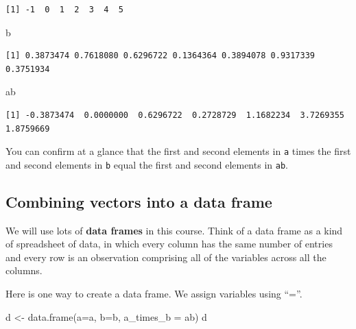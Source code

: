 \documentclass[
  letterpaper,
  DIV=11,
  numbers=noendperiod]{scrreprt}
\newenvironment{Shaded}{\begin{snugshade}}{\end{snugshade}}
\newcommand{\AttributeTok}[1]{\textcolor[rgb]{0.40,0.45,0.13}{#1}}
\newcommand{\FunctionTok}[1]{\textcolor[rgb]{0.28,0.35,0.67}{#1}}
\newcommand{\NormalTok}[1]{\textcolor[rgb]{0.00,0.23,0.31}{#1}}
\newcommand{\OtherTok}[1]{\textcolor[rgb]{0.00,0.23,0.31}{#1}}
\begin{document}
\begin{verbatim}
[1] -1  0  1  2  3  4  5
\end{verbatim}

\begin{Shaded}
\begin{Highlighting}[]
\NormalTok{b}
\end{Highlighting}
\end{Shaded}

\begin{verbatim}
[1] 0.3873474 0.7618080 0.6296722 0.1364364 0.3894078 0.9317339 0.3751934
\end{verbatim}

\begin{Shaded}
\begin{Highlighting}[]
\NormalTok{ab}
\end{Highlighting}
\end{Shaded}

\begin{verbatim}
[1] -0.3873474  0.0000000  0.6296722  0.2728729  1.1682234  3.7269355  1.8759669
\end{verbatim}

You can confirm at a glance that the first and second elements in
\texttt{a} times the first and second elements in \texttt{b} equal the
first and second elements in \texttt{ab}.

\subsection{Combining vectors into a data
frame}\label{combining-vectors-into-a-data-frame}

We will use lots of \textbf{data frames} in this course. Think of a data
frame as a kind of spreadsheet of data, in which every column has the
same number of entries and every row is an observation comprising all of
the variables across all the columns.

Here is one way to create a data frame. We assign variables using ``=''.

\begin{Shaded}
\begin{Highlighting}[]
\NormalTok{d }\OtherTok{\textless{}{-}} \FunctionTok{data.frame}\NormalTok{(}\AttributeTok{a=}\NormalTok{a, }\AttributeTok{b=}\NormalTok{b, }\AttributeTok{a\_times\_b =}\NormalTok{ ab)}
\NormalTok{d}
\end{Highlighting}
\end{Shaded}
\end{document}

